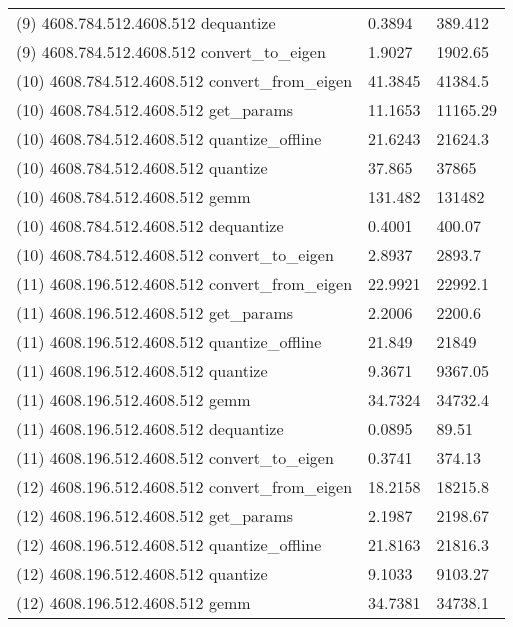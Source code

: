 \begin{longtable}{lll}
(9) 4608.784.512.4608.512 dequantize             & 0.3894         & 389.412          \\
(9) 4608.784.512.4608.512 convert\_to\_eigen     & 1.9027         & 1902.65          \\
(10) 4608.784.512.4608.512 convert\_from\_eigen  & 41.3845        & 41384.5          \\
(10) 4608.784.512.4608.512 get\_params           & 11.1653        & 11165.29         \\
(10) 4608.784.512.4608.512 quantize\_offline     & 21.6243        & 21624.3          \\
(10) 4608.784.512.4608.512 quantize              & 37.865         & 37865            \\
(10) 4608.784.512.4608.512 gemm                  & 131.482        & 131482           \\
(10) 4608.784.512.4608.512 dequantize            & 0.4001         & 400.07           \\
(10) 4608.784.512.4608.512 convert\_to\_eigen    & 2.8937         & 2893.7           \\
(11) 4608.196.512.4608.512 convert\_from\_eigen  & 22.9921        & 22992.1          \\
(11) 4608.196.512.4608.512 get\_params           & 2.2006         & 2200.6           \\
(11) 4608.196.512.4608.512 quantize\_offline     & 21.849         & 21849            \\
(11) 4608.196.512.4608.512 quantize              & 9.3671         & 9367.05          \\
(11) 4608.196.512.4608.512 gemm                  & 34.7324        & 34732.4          \\
(11) 4608.196.512.4608.512 dequantize            & 0.0895         & 89.51            \\
(11) 4608.196.512.4608.512 convert\_to\_eigen    & 0.3741         & 374.13           \\
(12) 4608.196.512.4608.512 convert\_from\_eigen  & 18.2158        & 18215.8          \\
(12) 4608.196.512.4608.512 get\_params           & 2.1987         & 2198.67          \\
(12) 4608.196.512.4608.512 quantize\_offline     & 21.8163        & 21816.3          \\
(12) 4608.196.512.4608.512 quantize              & 9.1033         & 9103.27          \\
(12) 4608.196.512.4608.512 gemm                  & 34.7381        & 34738.1          \\

\end{longtable}
